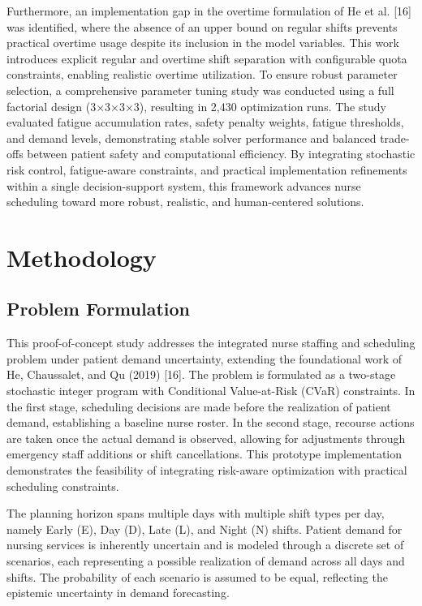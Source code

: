 \documentclass[10pt,a4paper,twocolumn]{article}
\begin{document}
Furthermore, an implementation gap in the overtime formulation of He et al. [16] was identified, where the absence of an upper bound on regular shifts prevents practical overtime usage despite its inclusion in the model variables. This work introduces explicit regular and overtime shift separation with configurable quota constraints, enabling realistic overtime utilization.
To ensure robust parameter selection, a comprehensive parameter tuning study was conducted using a full factorial design (3×3×3×3), resulting in 2,430 optimization runs. The study evaluated fatigue accumulation rates, safety penalty weights, fatigue thresholds, and demand levels, demonstrating stable solver performance and balanced trade-offs between patient safety and computational efficiency.
By integrating stochastic risk control, fatigue-aware constraints, and practical implementation refinements within a single decision-support system, this framework advances nurse scheduling toward more robust, realistic, and human-centered solutions.
\section{Methodology}

\subsection{Problem Formulation}

This proof-of-concept study addresses the integrated nurse staffing and scheduling problem under patient demand uncertainty, extending the foundational work of He, Chaussalet, and Qu (2019) [16]. The problem is formulated as a two-stage stochastic integer program with Conditional Value-at-Risk (CVaR) constraints. In the first stage, scheduling decisions are made before the realization of patient demand, establishing a baseline nurse roster. In the second stage, recourse actions are taken once the actual demand is observed, allowing for adjustments through emergency staff additions or shift cancellations. This prototype implementation demonstrates the feasibility of integrating risk-aware optimization with practical scheduling constraints.

The planning horizon spans multiple days with multiple shift types per day, namely Early (E), Day (D), Late (L), and Night (N) shifts. Patient demand for nursing services is inherently uncertain and is modeled through a discrete set of scenarios, each representing a possible realization of demand across all days and shifts. The probability of each scenario is assumed to be equal, reflecting the epistemic uncertainty in demand forecasting.
\end{document}
